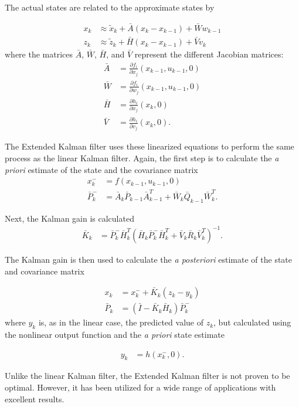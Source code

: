 The actual states are related to the approximate states by

\begin{align}
x_k &\approx\tilde{x}_k+\bar{A}(x_k-x_{k-1})+\bar{W}w_{k-1}\\
z_k &\approx\tilde{z}_k+\bar{H}(x_k-x_{k-1})+\bar{V}v_k
\end{align}
\noindent
where  the matrices $\bar{A}$, $\bar{W}$, $\bar{H}$, and $\bar{V}$ represent the different Jacobian matrices:
\begin{align}
\bar{A} &= \frac{\partial f_i}{\partial x_j}(x_{k-1},u_{k-1},0)\\
\bar{W} &= \frac{\partial f_i}{\partial w_j}(x_{k-1},u_{k-1},0)\\
\bar{H} &= \frac{\partial h_i}{\partial x_j}(x_{k},0)\\
\bar{V} &= \frac{\partial h_i}{\partial v_j}(x_{k},0).
\end{align}

The Extended Kalman filter uses these linearized equations to perform the same process as the linear Kalman filter. Again, the first step is to calculate the \textit{a priori} estimate of the state and the covariance matrix
\begin{align}
x^-_k &=f(x_{k-1},u_{k-1},0)\\
\bar{P}^-_k  &= \bar{A}_k\bar{P}_{k-1}\bar{A}^T_{k-1}+\bar{W}_k\bar{Q}_{k-1}\bar{W}^T_k.
\end{align}

Next, the Kalman gain is calculated
\begin{align}
\bar{K}_k &=\bar{P}^-_k\bar{H}^T_k(\bar{H}_k\bar{P}^-_k\bar{H}^T_k+\bar{V}_k\bar{R}_k\bar{V}^T_k)^{-1}.
\end{align}

The Kalman gain is then used to calculate the \textit{a posteriori} estimate of the state and covariance matrix

\begin{align}
x_k &=x^-_{k}+\bar{K}_k(z_k-y_k)\\
\label{kalmanVariance}
\bar{P}_k &=(\bar{I}-\bar{K}_k\bar{H}_k)\bar{P}^-_k
\end{align}
\noindent
where $y_k$ is, as in the linear case, the predicted value of $z_k$, but calculated using the nonlinear output function and the \textit{a priori} state estimate

\begin{align}
y_k &= h(x^-_k,0).
\end{align}

Unlike the linear Kalman filter, the Extended Kalman filter is not proven to be optimal. However, it has been utilized for a wide range of applications with excellent results.
